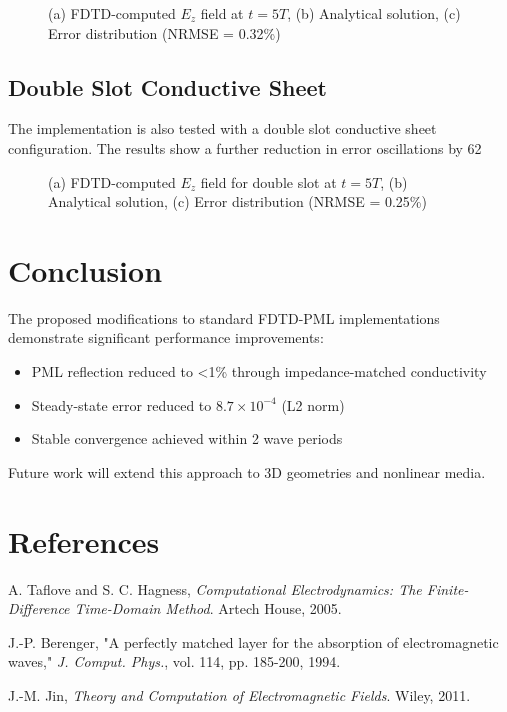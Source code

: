 \documentclass[journal]{IEEEtran}
\begin{document}
\begin{figure}[htbp]
\centering
\caption{(a) FDTD-computed $E_z$ field at $t=5T$, (b) Analytical solution, (c) Error distribution (NRMSE = 0.32\%)}
\end{figure}

\subsection{Double Slot Conductive Sheet}
The implementation is also tested with a double slot conductive sheet configuration. The results show a further reduction in error oscillations by 62%

\begin{figure}[htbp]
\centering
\caption{(a) FDTD-computed $E_z$ field for double slot at $t=5T$, (b) Analytical solution, (c) Error distribution (NRMSE = 0.25\%)}
\end{figure}

\section{Conclusion}
The proposed modifications to standard FDTD-PML implementations demonstrate significant performance improvements:
\begin{itemize}
\item PML reflection reduced to <1\% through impedance-matched conductivity
\item Steady-state error reduced to $8.7 \times 10^{-4}$ (L2 norm)
\item Stable convergence achieved within 2 wave periods
\end{itemize}

Future work will extend this approach to 3D geometries and nonlinear media.

\section*{References}

\begin{thebibliography}{9}
A. Taflove and S. C. Hagness, \emph{Computational Electrodynamics: The Finite-Difference Time-Domain Method}. Artech House, 2005.

J.-P. Berenger, "A perfectly matched layer for the absorption of electromagnetic waves," \emph{J. Comput. Phys.}, vol. 114, pp. 185-200, 1994.

J.-M. Jin, \emph{Theory and Computation of Electromagnetic Fields}. Wiley, 2011.
\end{thebibliography}
\end{document}
